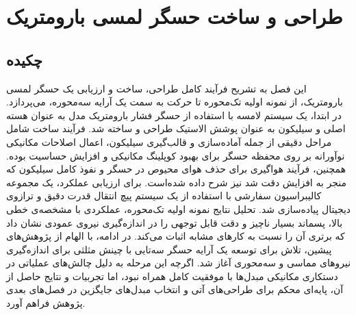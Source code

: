 \chapter{ طراحی و ساخت حسگر لمسی بارومتریک}
\label{chap2}
\section{چکیده}
این فصل به تشریح فرآیند کامل طراحی، ساخت و ارزیابی یک حسگر لمسی بارومتریک، از نمونه اولیه تک‌محوره تا حرکت به سمت یک آرایه سه‌محوره، می‌پردازد. در ابتدا، یک سیستم لامسه با استفاده از حسگر فشار بارومتریک مدل  به عنوان هسته اصلی و سیلیکون  به عنوان پوشش الاستیک طراحی و ساخته شد. فرآیند ساخت شامل مراحل دقیقی از جمله آماده‌سازی و قالب‌گیری سیلیکون، اعمال اصلاحات مکانیکی نوآورانه بر روی محفظه حسگر برای بهبود کوپلینگ مکانیکی و افزایش حساسیت بوده. همچنین، فرآیند هواگیری برای حذف هوای محیوص در حسگر و نفوذ کامل سیلیکون که منجر به افزایش دقت شد نیز شرح داده شده‌است. برای ارزیابی عملکرد، یک مجموعه کالیبراسیون سفارشی با استفاده از یک سیستم پیچ انتقال قدرت دقیق و ترازوی دیجیتال پیاده‌سازی شد. تحلیل نتایج نمونه اولیه تک‌محوره، عملکردی با مشخصه‌ی خطی بالا، پسماند بسیار ناچیز و دقت قابل توجهی را در اندازه‌گیری نیروی عمودی نشان داد که برتری آن را نسبت به کارهای مشابه اثبات می‌کند. در ادامه، با الهام از پژوهش‌های پیشین، تلاش برای توسعه یک آرایه حسگر سه‌تایی با چینش مثلثی برای اندازه‌گیری نیروهای مماسی و سه‌محوری آغاز شد. اگرچه این مرحله به دلیل چالش‌های عملیاتی در دستکاری مکانیکی مبدل‌ها با موفقیت کامل همراه نبود، اما تجربیات و نتایج حاصل از آن، پایه‌ای محکم برای طراحی‌های آتی و انتخاب مبدل‌های جایگزین در فصل‌های بعدی پژوهش فراهم آورد.
\\

